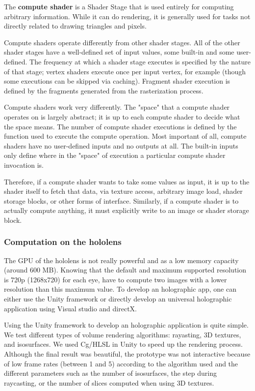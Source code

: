 The \textbf{ compute shader} is a Shader Stage that is used entirely for computing arbitrary information. While it can do rendering, it is generally used for tasks not directly related to drawing triangles and pixels.

Compute shaders operate differently from other shader stages. All of the other shader stages have a well-defined set of input values, some built-in and some user-defined. The frequency at which a shader stage executes is specified by the nature of that stage; vertex shaders execute once per input vertex, for example (though some executions can be skipped via caching). Fragment shader execution is defined by the fragments generated from the rasterization process.

Compute shaders work very differently. The "space" that a compute shader operates on is largely abstract; it is up to each compute shader to decide what the space means. The number of compute shader executions is defined by the function used to execute the compute operation. Most important of all, compute shaders have no user-defined inputs and no outputs at all. The built-in inputs only define where in the "space" of execution a particular compute shader invocation is.

Therefore, if a compute shader wants to take some values as input, it is up to the shader itself to fetch that data, via texture access, arbitrary image load, shader storage blocks, or other forms of interface. Similarly, if a compute shader is to actually compute anything, it must explicitly write to an image or shader storage block.

\subsubsection{Computation on the hololens}

The GPU of the hololens is not really powerful and as a low memory capacity (around 600 MB).  Knowing that the default and maximum supported resolution is 720p (1268x720) for each eye, have to compute two images with a lower resolution than this maximum value.  To develop an holographic app, one can either use the Unity framework or directly develop an universal holographic application using Visual studio and directX.


Using the Unity framework to develop an holographic application is quite simple. We test different types of volume rendering algorithms: rayasting, 3D textures, and isosurfaces.
We used Cg/HLSL in Unity to speed up the rendering process. Although the final result was beautiful, the prototype was not interactive because of low frame rates (between 1 and 5) according to the algorithm used and the different parameters such as the number of isosurfaces, the step during raycasting, or the number of slices computed when using 3D textures.


